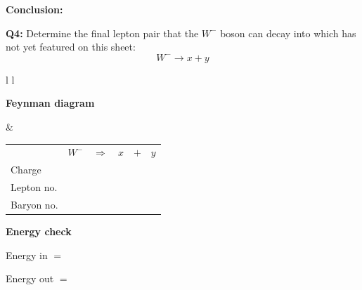 \documentclass[12pt]{article}
\begin{document}
\vspace{0.5cm}

\textbf{Conclusion:}

\vspace{2.5cm}

\newpage
\textbf{Q4:} Determine the final lepton pair that the $W^-$ boson can decay into which has not yet featured on this sheet:
\[
W^- \rightarrow x + y
\]

\vspace{0.5cm}

\begin{tabular}{l l}

\begin{minipage}[t]{0.46\textwidth}
\vspace{0pt}
\textbf{Feynman diagram}

\vspace{0.6cm}

\begin{tikzpicture}
\begin{feynman}
  \vertex (W) at (0,2) {};
  \vertex [coordinate] (v) at (3,2) {};

  \vertex (x) at (4,4) {\(x\)};
  \vertex (y) at (5,3) {\(y\)};

  \diagram*{
    (W) -- [boson, edge label=\(W^-\), momentum'={}] (v),
    (v) -- [fermion] (x),
    (v) -- [fermion] (y),
  };
\end{feynman}
\end{tikzpicture}
\end{minipage}
&
\begin{minipage}[t]{0.50\textwidth}
\vspace{0pt}

\renewcommand{\arraystretch}{1.4}
\begin{tabular}{@{}l c c c c c@{}}
 & \(W^-\) & \(\Rightarrow\) & \(x\) & \(+\) & \(y\) \\
Charge &  &  &  &  &  \\
Lepton no. &  &  &  &  &  \\
Baryon no. &  &  &  &  &  \\
\end{tabular}

\vspace{0.6cm}

\textbf{Energy check}

Energy in $=$

Energy out $=$

\end{minipage}

\end{tabular}
\end{document}
